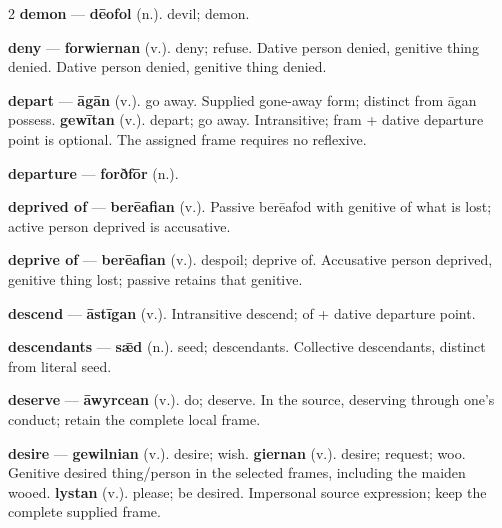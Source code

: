 \begin{multicols}{2}
\textbf{demon} — \textbf{dēofol} (n.). devil; demon.\par
\textbf{deny} — \textbf{forwiernan} (v.). deny; refuse. Dative person denied, genitive thing denied. Dative person denied, genitive thing denied.\par
\textbf{depart} — \textbf{āgān} (v.). go away. Supplied gone-away form; distinct from āgan possess. \textbf{gewītan} (v.). depart; go away. Intransitive; fram + dative departure point is optional. The assigned frame requires no reflexive.\par
\textbf{departure} — \textbf{forðfōr} (n.).\par
\textbf{deprived of} — \textbf{berēafian} (v.). Passive berēafod with genitive of what is lost; active person deprived is accusative.\par
\textbf{deprive of} — \textbf{berēafian} (v.). despoil; deprive of. Accusative person deprived, genitive thing lost; passive retains that genitive.\par
\textbf{descend} — \textbf{āstīgan} (v.). Intransitive descend; of + dative departure point.\par
\textbf{descendants} — \textbf{sǣd} (n.). seed; descendants. Collective descendants, distinct from literal seed.\par
\textbf{deserve} — \textbf{āwyrcean} (v.). do; deserve. In the source, deserving through one's conduct; retain the complete local frame.\par
\textbf{desire} — \textbf{gewilnian} (v.). desire; wish. \textbf{giernan} (v.). desire; request; woo. Genitive desired thing/person in the selected frames, including the maiden wooed. \textbf{lystan} (v.). please; be desired. Impersonal source expression; keep the complete supplied frame.\par

\end{multicols}
